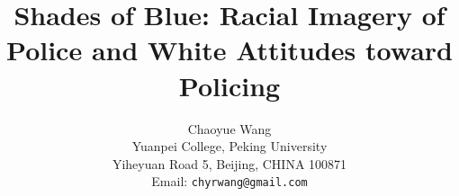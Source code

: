 \documentclass[12pt, letterpaper]{article}
\title{\textbf{Shades of Blue: Racial Imagery of Police and White
Attitudes toward Policing}}
\author{Chaoyue Wang \\ Yuanpei College, Peking University \\ Yiheyuan Road 5, Beijing, CHINA 100871 \\ Email: \texttt{chyrwang@gmail.com} }
\date{}
\begin{document}
\onehalfspacing


\maketitle

\end{document}

